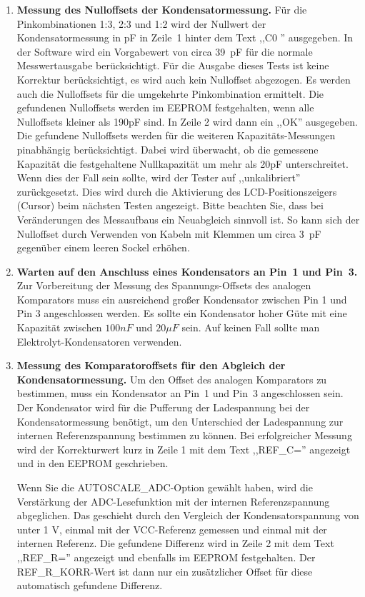 \begin{enumerate}
\item {\bf Messung des Nulloffsets der Kondensatormessung.}
Für die Pinkombinationen 1:3, 2:3 und 1:2 wird der Nullwert der Kondensatormessung in pF in Zeile~1
hinter dem Text ,,C0 '' ausgegeben.
In der Software wird ein Vorgabewert von circa 39~pF für die normale Messwertausgabe berücksichtigt.
Für die Ausgabe dieses Tests ist keine Korrektur berücksichtigt, es wird auch kein Nulloffset abgezogen.
Es werden auch die Nulloffsets für die umgekehrte Pinkombination ermittelt.
Die gefundenen Nulloffsets werden im EEPROM festgehalten, wenn alle Nulloffsets kleiner als 190pF sind.
In Zeile 2 wird dann ein ,,OK'' ausgegeben.
Die gefundene Nulloffsets werden für die weiteren Kapazitäts-Messungen pinabhängig berücksichtigt.
Dabei wird überwacht, ob die gemessene Kapazität die festgehaltene Nullkapazität um mehr als 20pF unterschreitet.
Wenn dies der Fall sein sollte, wird der Tester auf ,,unkalibriert'' zurückgesetzt.
Dies wird durch die Aktivierung des LCD-Positionszeigers (Cursor) beim nächsten Testen angezeigt.
Bitte beachten Sie, dass bei Veränderungen des Messaufbaus ein Neuabgleich sinnvoll ist.
So kann sich der Nulloffset durch Verwenden von Kabeln mit Klemmen um circa 3~pF gegenüber einem leeren
Sockel erhöhen.

\item {\bf Warten auf den Anschluss eines Kondensators an Pin~1 und Pin~3.}
Zur Vorbereitung der Messung des Spannungs-Offsets des analogen Komparators muss ein ausreichend großer
Kondensator zwischen Pin 1 und Pin 3 angeschlossen werden.
Es sollte ein Kondensator hoher Güte mit eine Kapazität zwischen \(100 nF\) und \(20 \mu F\) sein. 
Auf keinen Fall sollte man Elektrolyt-Kondensatoren verwenden.


\item {\bf Messung des Komparatoroffsets für den Abgleich der Kondensatormessung.}
Um den Offset des analogen Komparators zu bestimmen, muss ein Kondensator an Pin~1 und Pin~3 angeschlossen sein.
Der Kondensator wird für die Pufferung der Ladespannung bei der Kondensatormessung benötigt, um den Unterschied der 
Ladespannung zur internen Referenzspannung bestimmen zu können.
Bei erfolgreicher Messung wird der Korrekturwert kurz in Zeile 1 mit dem Text ,,REF\_C='' angezeigt und in den EEPROM geschrieben.

Wenn Sie die AUTOSCALE\_ADC-Option gewählt haben, wird die Verstärkung der ADC-Lesefunktion mit der
internen Referenzspannung abgeglichen. Das geschieht durch den Vergleich der Kondensatorspannung von unter 1 V, einmal mit
der VCC-Referenz gemessen und einmal mit der internen Referenz.
Die gefundene Differenz wird in Zeile 2 mit dem Text ,,REF\_R='' angezeigt und ebenfalls im EEPROM festgehalten.
Der REF\_R\_KORR-Wert ist dann nur ein zusätzlicher Offset für diese automatisch gefundene Differenz.

\end{enumerate}

